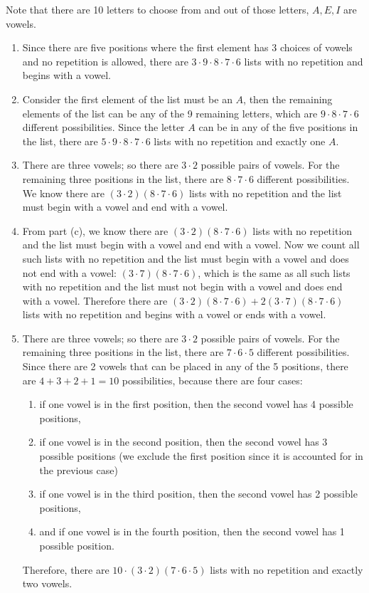 \documentclass{article}
\theoremstyle{definition}
\begin{document}
\begin{solution}
Note that there are 10 letters to choose from and out of those letters, $A, E, I$ are vowels.
    \begin{enumerate}
        \item Since there are five positions where the first element has 3 choices of vowels and no repetition is allowed, there are $3\cdot 9 \cdot 8\cdot 7\cdot 6$ lists with no repetition and begins with a vowel. 
        \item Consider the first element of the list must be an $A$, then the remaining elements of the list can be any of the 9 remaining letters, which are $9 \cdot 8\cdot 7\cdot 6$ different possibilities. Since the letter $A$ can be in any of the five positions in the list, there are $5\cdot 9 \cdot 8\cdot 7\cdot 6$ lists with no repetition and exactly one $A$.
        \item There are three vowels; so there are $3\cdot 2$ possible pairs of vowels. For the remaining three positions in the list, there are $8\cdot 7\cdot 6$ different possibilities. We know there are $(3\cdot 2)(8\cdot 7\cdot 6)$ lists with no repetition and the list must begin with a vowel and end with a vowel.
        \item From part (c), we know there are $(3\cdot 2)(8\cdot 7\cdot 6)$ lists with no repetition and the list must begin with a vowel and end with a vowel. Now we count all such lists with no repetition and the list must begin with a vowel and does not end with a vowel: $(3\cdot 7)( 8\cdot 7\cdot 6)$, which is the same as all such lists with no repetition and the list must not begin with a vowel and does end with a vowel. Therefore there are $(3\cdot 2)(8\cdot 7\cdot 6) + 2(3\cdot 7)( 8\cdot 7\cdot 6)$ lists with no repetition and begins with a vowel or ends with a vowel.
        \item There are three vowels; so there are $3\cdot 2$ possible pairs of vowels. For the remaining three positions in the list, there are $7\cdot 6\cdot 5$ different possibilities. Since there are 2 vowels that can be placed in any of the 5 positions, there are $4+3+2+1=10$ possibilities, because there are four cases: 
        		\begin{enumerate}
		\item if one vowel is in the first position, then the second vowel has 4 possible positions,
		\item if one vowel is in the second position, then the second vowel has 3 possible positions (we exclude the first position since it is accounted for in the previous case)
		\item if one vowel is in the third position, then the second vowel has 2 possible positions, 
		\item and if one vowel is in the fourth position, then the second vowel has 1 possible position.
		\end{enumerate}
	Therefore, there are $10\cdot(3\cdot 2)(7\cdot 6\cdot 5)$ lists with no repetition and exactly two vowels.
    \end{enumerate}


\end{solution}
\end{document}
